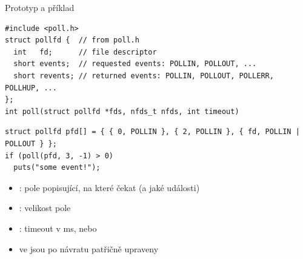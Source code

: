\begin{frame}[fragile]{}

  \begin{block}{Prototyp a příklad}
  \begin{lstlisting}[aboveskip=2pt]
#include <poll.h>
struct pollfd {  // from poll.h
  int   fd;      // file descriptor
  short events;  // requested events: POLLIN, POLLOUT, ...
  short revents; // returned events: POLLIN, POLLOUT, POLLERR, POLLHUP, ...
};
int poll(struct pollfd *fds, nfds_t nfds, int timeout)
  \end{lstlisting}
  \begin{lstlisting}[belowskip=2pt]
struct pollfd pfd[] = { { 0, POLLIN }, { 2, POLLIN }, { fd, POLLIN | POLLOUT } };
if (poll(pfd, 3, -1) > 0)
  puts("some event!");
  \end{lstlisting}
  \end{block}


  \begin{itemize}
    \item {}: pole popisující, na které  čekat (a jaké
      události)
    \item {}: velikost pole 

    \pause

    \item {}: timeout v ms, nebo 

    \pause

  \item {} ve  jsou po návratu patřičně upraveny
  \end{itemize}

\end{frame}

